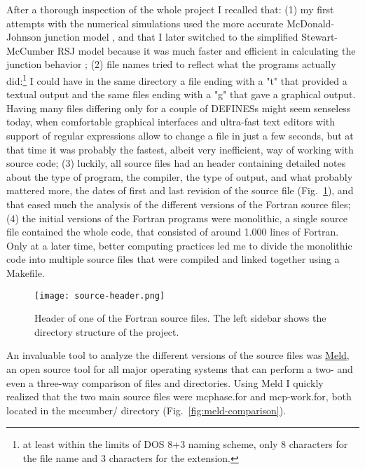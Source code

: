 After a thorough inspection of the whole project I recalled that: 
(1) my first attempts with the numerical simulations used the more accurate McDonald-Johnson junction model \cite{McDonald:1976}, and that I later switched to the simplified Stewart-McCumber RSJ model because it was much faster and efficient in calculating the junction behavior \cite{McCumber:1968, Stewart:1974}; 
(2) file names tried to reflect what the programs actually did:\footnote{at least within the limits of DOS 8+3 naming scheme, only 8 characters for the file name and 3 characters for the extension.} 
I could have in the same directory a file ending with a "t" that provided a textual output and the same files ending with a "g" that gave a graphical output. Having many files differing only for a couple of \textsf{DEFINES}s might seem senseless today, when comfortable graphical interfaces and ultra-fast text editors with support of regular expressions allow to change a file in just a few seconds, but at that time it was probably the fastest, albeit very inefficient, way of working with source code;
(3) luckily, all source files had an header containing detailed notes about the type of program, the compiler, the type of output, and what probably mattered more, the dates of first and last revision of the source file (Fig.~\ref{fig:source-header}), and that eased much the analysis of the different versions of the Fortran source files; 
(4) the initial versions of the Fortran programs were monolithic, a single source file contained the whole code, that consisted of around 1.000 lines of Fortran. Only at a later time, better computing practices led me to divide the monolithic code into multiple source files that were compiled and linked together using a \textsf{Makefile}.

\begin{figure}[tb]
	\centering
	\texttt{[image: source-header.png]}
	\caption{Header of one of the Fortran source files. The left sidebar shows the directory structure of the project.}
	\label{fig:source-header}
\end{figure}


An invaluable tool to analyze the different versions of the source files was \href{http://meldmerge.org/}{Meld}, an open source tool for all major operating systems that can perform a two- and even a three-way comparison of files and directories.
Using Meld I quickly realized that the two main source files were \textsf{mcphase.for} and \textsf{mcp-work.for}, both located in the \textsf{mccumber/} directory  (Fig.~\ref{fig:meld-comparison}).

